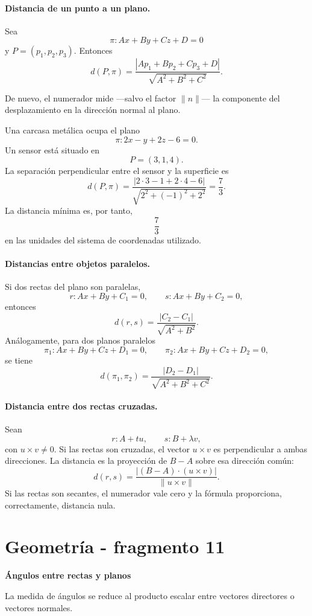 \paragraph{Distancia de un punto a un plano.}
Sea
\[
\pi:Ax+By+Cz+D=0
\]
y $P=(p_1,p_2,p_3)$. Entonces
\[
\boxed{
 d(P,\pi)
 =\frac{|Ap_1+Bp_2+Cp_3+D|}{\sqrt{A^2+B^2+C^2}}.}
\]

De nuevo, el numerador mide ---salvo el factor $\|n\|$--- la componente del desplazamiento en la dirección normal al plano.

\begin{example}
Una carcasa metálica ocupa el plano
\[
\pi:2x-y+2z-6=0.
\]
Un sensor está situado en
\[
P=(3,1,4).
\]
La separación perpendicular entre el sensor y la superficie es
\[
d(P,\pi)
=\frac{|2\cdot3-1+2\cdot4-6|}{\sqrt{2^2+(-1)^2+2^2}}
=\frac{7}{3}.
\]
La distancia mínima es, por tanto,
\[
\boxed{\frac73}
\]
en las unidades del sistema de coordenadas utilizado.
\end{example}

\paragraph{Distancias entre objetos paralelos.}
Si dos rectas del plano son paralelas,
\[
r:Ax+By+C_1=0,
\qquad
s:Ax+By+C_2=0,
\]
entonces
\[
\boxed{
 d(r,s)=\frac{|C_2-C_1|}{\sqrt{A^2+B^2}}.}
\]
Análogamente, para dos planos paralelos
\[
\pi_1:Ax+By+Cz+D_1=0,
\qquad
\pi_2:Ax+By+Cz+D_2=0,
\]
se tiene
\[
\boxed{
 d(\pi_1,\pi_2)
 =\frac{|D_2-D_1|}{\sqrt{A^2+B^2+C^2}}.}
\]

\paragraph{Distancia entre dos rectas cruzadas.}
Sean
\[
r:A+tu,
\qquad
s:B+\lambda v,
\]
con $u\times v\neq0$. Si las rectas son cruzadas, el vector $u\times v$ es perpendicular a ambas direcciones. La distancia es la proyección de $B-A$ sobre esa dirección común:
\[
\boxed{
 d(r,s)
 =\frac{|(B-A)\cdot(u\times v)|}{\|u\times v\|}.}
\]
Si las rectas son secantes, el numerador vale cero y la fórmula proporciona, correctamente, distancia nula.


\section{Geometría - fragmento 11}
\textbf{Ángulos entre rectas y planos}

La medida de ángulos se reduce al producto escalar entre vectores directores o vectores normales.

